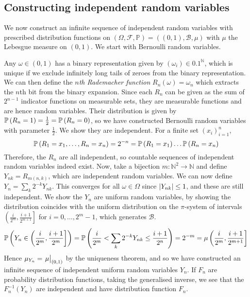 \subsection{Constructing independent random variables}
We now construct an infinite sequence of independent random variables with prescribed distribution functions on \( (\Omega, \mathcal F, \mathbb P) = ((0,1), \mathcal B, \mu) \) with \( \mu \) the Lebesgue measure on \( (0,1) \).
We start with Bernoulli random variables.

Any \( \omega \in (0,1) \) has a binary representation given by \( (\omega_i) \in \qty{0,1}^{\mathbb N} \), which is unique if we exclude infinitely long tails of zeroes from the binary representation.
We can then define the \emph{\( n \)th Rademacher function} \( R_n(\omega) = \omega_n \) which extracts the \( n \)th bit from the binary expansion.
Since each \( R_n \) can be given as the sum of \( 2^{n-1} \) indicator functions on measurable sets, they are measurable functions and are hence random variables.
Their distribution is given by \( \mathbb{P}\left({R_n = 1}\right) = \frac{1}{2} = \mathbb{P}\left({R_n = 0}\right) \), so we have constructed Bernoulli random variables with parameter \( \frac 12 \).
We show they are independent.
For a finite set \( (x_i)_{i=1}^n \),
\[ \mathbb{P}\left({R_1 = x_1, \dots, R_n = x_n}\right) = 2^{-n} = \mathbb{P}\left({R_1 = x_1}\right) \dots \mathbb{P}\left({R_n = x_n}\right) \]
Therefore, the \( R_n \) are all independent, so countable sequences of independent random variables indeed exist.
Now, take a bijection \( m \colon \mathbb N^2 \to \mathbb N \) and define \( Y_{nk} = R_{m(n,k)} \), which are independent random variables.
We can now define \( Y_n = \sum_k 2^{-k} Y_{nk} \).
This converges for all \( \omega \in \Omega \) since \( \abs{Y_{nk}} \leq 1 \), and these are still independent.
We show the \( Y_n \) are uniform random variables, by showing the distribution coincides with the uniform distribution on the \( \pi \)-system of intervals \( \left( \frac{i}{2^m}, \frac{i+1}{2^{m+1}} \right] \) for \( i = 0, \dots, 2^m - 1 \), which generates \( \mathcal B \).
\[ \mathbb{P}\left({Y_n \in \left( \frac{i}{2^m}, \frac{i+1}{2^m} \right]}\right) = \mathbb{P}\left({\frac{i}{2^m} < \sum_k 2^{-k} Y_{nk} \leq \frac{i+1}{2^n}}\right) = 2^{-m} = \mu\left( \frac{i}{2^m}, \frac{i+1}{2^{m+1}} \right] \]
Hence \( \mu_{Y_n} = \eval{\mu}_{(0,1)} \) by the uniqueness theorem, and so we have constructed an infinite sequence of independent uniform random variables \( Y_n \).
If \( F_n \) are probability distribution functions, taking the generalised inverse, we see that the \( F_n^{-1}(Y_n) \) are independent and have distribution function \( F_n \).

